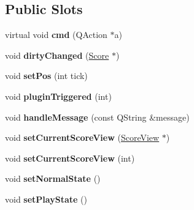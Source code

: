\subsection*{Public Slots}
\begin{DoxyCompactItemize}
\item 
\mbox{\label{class_ms_1_1_muse_score_a3a3fc0ca3feec369d8775a800e800f53}} 
virtual void {\bfseries cmd} (Q\+Action $\ast$a)
\item 
\mbox{\label{class_ms_1_1_muse_score_a1d57b87aec2cca800e59540d0e0c1cd5}} 
void {\bfseries dirty\+Changed} (\hyperlink{class_ms_1_1_score}{Score} $\ast$)
\item 
\mbox{\label{class_ms_1_1_muse_score_af209fcd634694db26c7de54b027a04f8}} 
void {\bfseries set\+Pos} (int tick)
\item 
\mbox{\label{class_ms_1_1_muse_score_a12183f2c689b338840ced96e6c1118ce}} 
void {\bfseries plugin\+Triggered} (int)
\item 
\mbox{\label{class_ms_1_1_muse_score_a5c2becf161fa66cd7433b9249bfb8fee}} 
void {\bfseries handle\+Message} (const Q\+String \&message)
\item 
\mbox{\label{class_ms_1_1_muse_score_ab12adecdb5ff0e64710de0d8b54f7fef}} 
void {\bfseries set\+Current\+Score\+View} (\hyperlink{class_ms_1_1_score_view}{Score\+View} $\ast$)
\item 
\mbox{\label{class_ms_1_1_muse_score_a1b1e8dca9d0f22e83d2cec329fa7d27b}} 
void {\bfseries set\+Current\+Score\+View} (int)
\item 
\mbox{\label{class_ms_1_1_muse_score_a849be96790bbe24897cd972f806256f2}} 
void {\bfseries set\+Normal\+State} ()
\item 
\mbox{\label{class_ms_1_1_muse_score_a1e79c9d9a847778ab72cce4d67dec4a2}} 
void {\bfseries set\+Play\+State} ()
\item 
\mbox{\label{class_ms_1_1_muse_score_a94f005e372b61bf6deff67f4b1e939a5}} 

\end{DoxyCompactItemize}
